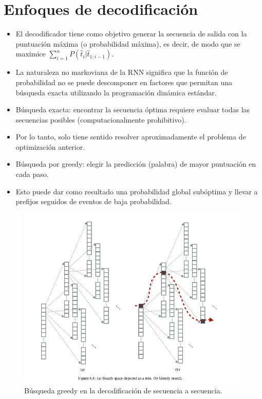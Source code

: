 \section{Enfoques de decodificación}
\begin{itemize}
\item El decodificador tiene como objetivo generar la secuencia de salida con la puntuación máxima (o probabilidad máxima), es decir, de modo que se maximice $\sum_{i=1}^{n}P(\hat{t}_i | \hat{t}_{1:i-1})$.
\item La naturaleza no markoviana de la RNN significa que la función de probabilidad no se puede descomponer en factores que permitan una búsqueda exacta utilizando la programación dinámica estándar.
\item Búsqueda exacta: encontrar la secuencia óptima requiere evaluar todas las secuencias posibles (computacionalmente prohibitivo).
\item Por lo tanto, solo tiene sentido resolver aproximadamente el problema de optimización anterior.
\item Búsqueda por greedy: elegir la predicción (palabra) de mayor puntuación en cada paso.
\item Esto puede dar como resultado una probabilidad global subóptima y llevar a prefijos seguidos de eventos de baja probabilidad.
\end{itemize}


\begin{figure}[h]
  \centering
  \includegraphics[scale=0.3]{pics/greedysearch.png}
  \caption{Búsqueda greedy en la decodificación de secuencia a secuencia.}
\end{figure}



